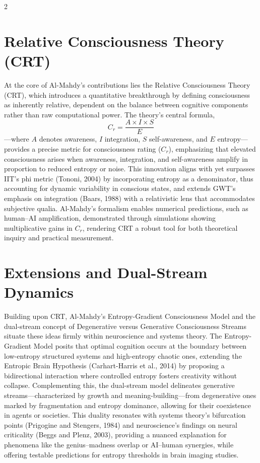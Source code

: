 \documentclass[11pt,a4paper]{article}
\begin{document}
\begin{multicols}{2}
\section*{Relative Consciousness Theory (CRT)}
At the core of Al-Mahdy's contributions lies the Relative Consciousness Theory (CRT), which introduces a quantitative breakthrough by defining consciousness as inherently relative, dependent on the balance between cognitive components rather than raw computational power. The theory's central formula, 
\[
C_r = \frac{A \times I \times S}{E}
\]
—where \(A\) denotes awareness, \(I\) integration, \(S\) self-awareness, and \(E\) entropy—provides a precise metric for consciousness rating (\(C_r\)), emphasizing that elevated consciousness arises when awareness, integration, and self-awareness amplify in proportion to reduced entropy or noise. This innovation aligns with yet surpasses IIT's phi metric (Tononi, 2004) by incorporating entropy as a denominator, thus accounting for dynamic variability in conscious states, and extends GWT's emphasis on integration (Baars, 1988) with a relativistic lens that accommodates subjective qualia. Al-Mahdy's formalism enables numerical predictions, such as human--AI amplification, demonstrated through simulations showing multiplicative gains in \(C_r\), rendering CRT a robust tool for both theoretical inquiry and practical measurement.

\section*{Extensions and Dual-Stream Dynamics}
Building upon CRT, Al-Mahdy's Entropy-Gradient Consciousness Model and the dual-stream concept of Degenerative versus Generative Consciousness Streams situate these ideas firmly within neuroscience and systems theory. The Entropy-Gradient Model posits that optimal cognition occurs at the boundary between low-entropy structured systems and high-entropy chaotic ones, extending the Entropic Brain Hypothesis (Carhart-Harris et al., 2014) by proposing a bidirectional interaction where controlled entropy fosters creativity without collapse. Complementing this, the dual-stream model delineates generative streams—characterized by growth and meaning-building—from degenerative ones marked by fragmentation and entropy dominance, allowing for their coexistence in agents or societies. This duality resonates with systems theory's bifurcation points (Prigogine and Stengers, 1984) and neuroscience's findings on neural criticality (Beggs and Plenz, 2003), providing a nuanced explanation for phenomena like the genius--madness overlap or AI--human synergies, while offering testable predictions for entropy thresholds in brain imaging studies.


\end{multicols}
\end{document}
